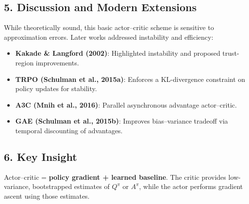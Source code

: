 \documentclass[12pt]{article}
\begin{document}
\subsection*{5. Discussion and Modern Extensions}
While theoretically sound, this basic actor--critic scheme is sensitive to approximation
errors. Later works addressed instability and efficiency:
\begin{itemize}
		\item \textbf{Kakade \& Langford (2002)}: Highlighted instability and proposed
				trust-region improvements.
		\item \textbf{TRPO (Schulman et al., 2015a)}: Enforces a KL-divergence constraint on
				policy updates for stability.
		\item \textbf{A3C (Mnih et al., 2016)}: Parallel asynchronous advantage actor--critic.
		\item \textbf{GAE (Schulman et al., 2015b)}: Improves bias--variance tradeoff via
				temporal discounting of advantages.
\end{itemize}

\subsection*{6. Key Insight}
Actor--critic = \textbf{policy gradient + learned baseline}.
The critic provides low-variance, bootstrapped estimates of $Q^\pi$ or $A^\pi$, while the
actor performs gradient ascent using those estimates.
\end{document}
